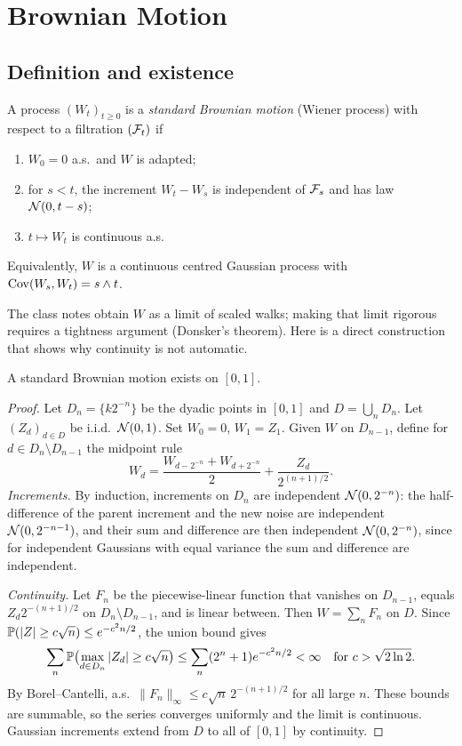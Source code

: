 \chapter{Brownian Motion}\label{ch:bm}

\section{Definition and existence}

\begin{definition}\label{def:bm}
A process $(W_t)_{t\ge0}$ is a \emph{standard Brownian motion} (Wiener process) with respect to a filtration $(\mathcal{F}_t)$ if
\begin{enumerate}
\item $W_0=0$ a.s.\ and $W$ is adapted;
\item for $s<t$, the increment $W_t-W_s$ is independent of $\mathcal{F}_s$ and has law $\mathcal{N}(0,t-s)$;
\item $t\mapsto W_t$ is continuous a.s.
\end{enumerate}
\end{definition}

Equivalently, $W$ is a continuous centred Gaussian process with $\operatorname{Cov}(W_s,W_t)=s\wedge t$.

The class notes obtain $W$ as a limit of scaled walks; making that limit rigorous requires a tightness argument (Donsker's theorem). Here is a direct construction that shows why continuity is not automatic.

\begin{theorem}\label{thm:levy-constr}
A standard Brownian motion exists on $[0,1]$.
\end{theorem}
\begin{proof}
Let $D_n=\{k2^{-n}\}$ be the dyadic points in $[0,1]$ and $D=\bigcup_nD_n$. Let $(Z_d)_{d\in D}$ be i.i.d.\ $\mathcal{N}(0,1)$. Set $W_0=0$, $W_1=Z_1$. Given $W$ on $D_{n-1}$, define for $d\in D_n\setminus D_{n-1}$ the midpoint rule
\[
W_d=\frac{W_{d-2^{-n}}+W_{d+2^{-n}}}{2}+\frac{Z_d}{2^{(n+1)/2}}.
\]
\emph{Increments.} By induction, increments on $D_n$ are independent $\mathcal{N}(0,2^{-n})$: the half-difference of the parent increment and the new noise are independent $\mathcal{N}(0,2^{-n-1})$, and their sum and difference are then independent $\mathcal{N}(0,2^{-n})$, since for independent Gaussians with equal variance the sum and difference are independent.

\emph{Continuity.} Let $F_n$ be the piecewise-linear function that vanishes on $D_{n-1}$, equals $Z_d2^{-(n+1)/2}$ on $D_n\setminus D_{n-1}$, and is linear between. Then $W=\sum_nF_n$ on $D$. Since $\mathbb{P}(|Z|\ge c\sqrt n)\le e^{-c^2n/2}$, the union bound gives
\[
\sum_n\mathbb{P}\bigl(\max_{d\in D_n}|Z_d|\ge c\sqrt n\bigr)\le\sum_n(2^n+1)e^{-c^2n/2}<\infty\quad\text{for }c>\sqrt{2\ln2}.
\]
By Borel--Cantelli, a.s.\ $\|F_n\|_\infty\le c\sqrt n\,2^{-(n+1)/2}$ for all large $n$. These bounds are summable, so the series converges uniformly and the limit is continuous. Gaussian increments extend from $D$ to all of $[0,1]$ by continuity.
\end{proof}


